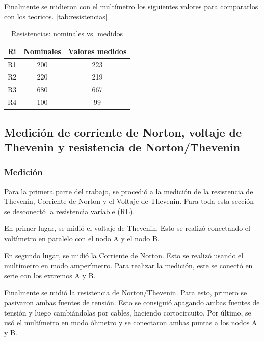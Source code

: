 \documentclass{article}
\begin{document}
        Finalmente se midieron con el multímetro los siguientes valores para compararlos con los teoricos. \autoref{tab:resistencias}\par
        
        \begin{table}[h!]
            \centering
            \begin{tabular}{|l|c|c|}
            \hline
            Ri & \multicolumn{1}{l|}{Nominales} & \multicolumn{1}{l|}{Valores medidos} \\ \hline
            R1 & 200                            & 223                                  \\ \hline
            R2 & 220                            & 219                                  \\ \hline
            R3 & 680                            & 667                                  \\ \hline
            R4 & 100                            & 99                                   \\ \hline
            \end{tabular}
            \caption{Resistencias: nominales vs. medidos}
            \label{tab:resistencias}
        \end{table}

        \subsection{Medición de corriente de Norton, voltaje de Thevenin y resistencia de Norton/Thevenin}
            \subsubsection{Medición}
                \quad Para la primera parte del trabajo, se procedió a la medición de la resistencia de Thevenin, Corriente de Norton y el Voltaje de Thevenin. Para toda esta sección se desconectó la resistencia variable (RL).\par
                En primer lugar, se midió el voltaje de Thevenin. Esto se realizó conectando el voltímetro en paralelo con el nodo A y el nodo B.\par
                En segundo lugar, se midió la Corriente de Norton. Esto se realizó usando el multímetro en modo amperímetro. Para realizar la medición, este se conectó en serie con los extremos A y B. \par
                Finalmente se midió la resistencia de Norton/Thevenin. Para esto, primero se  pasivaron ambas fuentes de tensión. Esto se consiguió apagando ambas fuentes de tensión y luego cambiándolas por cables, haciendo cortocircuito. Por último, se usó el multímetro en modo óhmetro y se conectaron ambas puntas a los nodos A y B.\par
\end{document}
